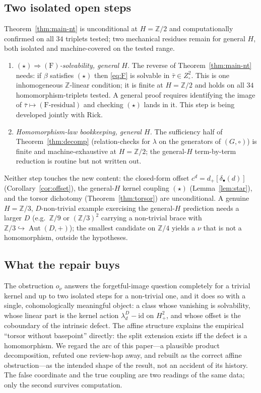 \documentclass[11pt,reqno]{amsart}
\theoremstyle{plain}
\theoremstyle{definition}
\newcommand{\Z}{\mathbb{Z}}
\newcommand{\id}{\mathrm{id}}
\newcommand{\Aut}{\operatorname{Aut}}
\newcommand{\lD}{\lambda^{D}}
\begin{document}
\subsection{Two isolated open steps}
Theorem~\ref{thm:main-nt} is unconditional at $H=\Z/2$ and computationally confirmed on
all $34$ triplets tested; two mechanical residues remain for general $H$, both isolated and
machine-covered on the tested range.
\begin{enumerate}\itemsep2pt
\item[(O1)] \emph{$(\star)\Rightarrow\mathrm{(F)}$-solvability, general $H$.} The reverse of
Theorem~\ref{thm:main-nt} needs: if $\beta$ satisfies $(\star)$ then \eqref{eq:F} is
solvable in $\bar\tau\in Z^2_\circ$. This is one inhomogeneous $\Z$-linear condition; it is
finite at $H=\Z/2$ and holds on all $34$ homomorphism-triplets tested. A general proof
requires identifying the image of $\bar\tau\mapsto(\mathrm{F}\text{-residual})$ and checking
$(\star)$ lands in it. This step is being developed jointly with Rick.
\item[(O2)] \emph{Homomorphism-law bookkeeping, general $H$.} The sufficiency half of
Theorem~\ref{thm:decomp} (relation-checks for $\lambda$ on the generators of $(G,\circ)$) is
finite and machine-exhaustive at $H=\Z/2$; the general-$H$ term-by-term reduction is routine
but not written out.
\end{enumerate}
Neither step touches the new content: the closed-form offset $c^d=d_+[\delta_\bullet(d)]$
(Corollary~\ref{cor:offset}), the general-$H$ kernel coupling $(\star)$
(Lemma~\ref{lem:star}), and the torsor dichotomy (Theorem~\ref{thm:torsor}) are
unconditional. A genuine $H=\Z/3$, $D$-non-trivial example exercising the general-$H$
prediction needs a larger $D$ (e.g.\ $\Z/9$ or $(\Z/3)^2$ carrying a non-trivial brace with
$\Z/3\hookrightarrow\Aut(D,+)$); the smallest candidate on $\Z/4$ yields a $\nu$ that is not
a homomorphism, outside the hypotheses.

\subsection{What the repair buys}
The obstruction $o_\nu$ answers the forgetful-image question completely for a trivial kernel
and up to two isolated steps for a non-trivial one, and it does so with a single,
cohomologically meaningful object: a class whose vanishing is solvability, whose linear part
is the kernel action $\lD_d-\id$ on $H^2_+$, and whose offset is the coboundary of the
intrinsic defect. The affine structure explains the empirical ``torsor without basepoint''
directly: the split extension exists iff the defect is a homomorphism. We regard the arc of
this paper---a plausible product decomposition, refuted one review-hop away, and rebuilt as
the correct affine obstruction---as the intended shape of the result, not an accident of its
history. The false coordinate and the true coupling are two readings of the same data; only
the second survives computation.
\end{document}
